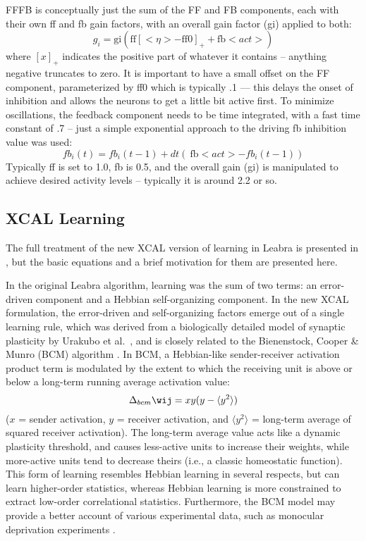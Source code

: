 FFFB is conceptually just the sum of the FF and FB components, each with their own ff and fb gain factors, with an overall gain factor (gi) applied to both:
\begin{equation}
  g_i = \mbox{gi} \left( \mbox{ff} [<\eta> - \mbox{ff0}]_+ + \mbox{fb} <act> \right)
  \label{eq.fffb}
\end{equation}
where $[ x ]_+$ indicates the positive part of whatever it contains -- anything negative truncates to zero.  It is important to have a small offset on the FF component, parameterized by ff0 which is typically .1 --- this delays the onset of inhibition and allows the neurons to get a little bit active first.  To minimize oscillations, the feedback component needs to be time integrated, with a fast time constant of .7 -- just a simple exponential approach to the driving fb inhibition value was used:
\begin{equation}
  fb_i(t) = fb_i(t-1) + dt \left(\ \mbox{fb} <act> - fb_i(t-1) \right)
  \label{eq.fbi}
\end{equation}
Typically ff is set to 1.0, fb is 0.5, and the overall gain (gi) is manipulated to achieve desired activity levels -- typically it is around 2.2 or so.

\subsection{XCAL Learning} 

The full treatment of the new XCAL version of learning in Leabra is presented in , but the basic equations and a brief motivation for them are presented here.

In the original Leabra algorithm, learning was the sum of two terms: an error-driven component and a Hebbian self-organizing component. In the new XCAL formulation, the error-driven and self-organizing factors emerge out of a single learning rule, which was derived from a biologically detailed model of synaptic plasticity by Urakubo et al.~\cite{UrakuboHondaFroemkeEtAl08}, and is closely related to the Bienenstock, Cooper \& Munro (BCM) algorithm \cite{BienenstockCooperMunro82}. In BCM, a Hebbian-like sender-receiver activation product term is modulated by the extent to which the receiving unit is above or below a long-term running average activation value:
\begin{equation}
 \Delta_{bcm} \wij = xy (y - \langle y^2 \rangle)
 \label{eq:bcm}
\end{equation}
($x$ = sender activation, $y$ = receiver activation, and $\langle y^2 \rangle$ = long-term average of squared receiver activation). The long-term average value acts like a dynamic plasticity threshold, and causes less-active units to increase their weights, while more-active units tend to decrease theirs (i.e., a classic homeostatic function). This form of learning resembles Hebbian learning in several respects, but can learn higher-order statistics, whereas Hebbian learning is more constrained to extract low-order correlational statistics. Furthermore, the BCM model may provide a better account of various experimental data, such as monocular deprivation experiments \cite{CooperIntratorBlaisEtAl04}.

